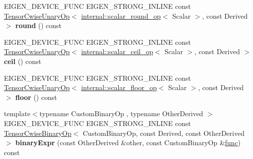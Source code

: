 \begin{DoxyCompactItemize}
E\+I\+G\+E\+N\+\_\+\+D\+E\+V\+I\+C\+E\+\_\+\+F\+U\+NC E\+I\+G\+E\+N\+\_\+\+S\+T\+R\+O\+N\+G\+\_\+\+I\+N\+L\+I\+NE const \hyperlink{class_eigen_1_1_tensor_cwise_unary_op}{Tensor\+Cwise\+Unary\+Op}$<$ \hyperlink{struct_eigen_1_1internal_1_1scalar__round__op}{internal\+::scalar\+\_\+round\+\_\+op}$<$ Scalar $>$, const Derived $>$ {\bfseries round} () const
\item 
\mbox{\label{class_eigen_1_1_tensor_base_3_01_derived_00_01_read_only_accessors_01_4_afe6c3cbfe145dca6de73e1085c55b2f1}} 
E\+I\+G\+E\+N\+\_\+\+D\+E\+V\+I\+C\+E\+\_\+\+F\+U\+NC E\+I\+G\+E\+N\+\_\+\+S\+T\+R\+O\+N\+G\+\_\+\+I\+N\+L\+I\+NE const \hyperlink{class_eigen_1_1_tensor_cwise_unary_op}{Tensor\+Cwise\+Unary\+Op}$<$ \hyperlink{struct_eigen_1_1internal_1_1scalar__ceil__op}{internal\+::scalar\+\_\+ceil\+\_\+op}$<$ Scalar $>$, const Derived $>$ {\bfseries ceil} () const
\item 
\mbox{\label{class_eigen_1_1_tensor_base_3_01_derived_00_01_read_only_accessors_01_4_ac4d13e5ee3c8e5c992df4f7482aec549}} 
E\+I\+G\+E\+N\+\_\+\+D\+E\+V\+I\+C\+E\+\_\+\+F\+U\+NC E\+I\+G\+E\+N\+\_\+\+S\+T\+R\+O\+N\+G\+\_\+\+I\+N\+L\+I\+NE const \hyperlink{class_eigen_1_1_tensor_cwise_unary_op}{Tensor\+Cwise\+Unary\+Op}$<$ \hyperlink{struct_eigen_1_1internal_1_1scalar__floor__op}{internal\+::scalar\+\_\+floor\+\_\+op}$<$ Scalar $>$, const Derived $>$ {\bfseries floor} () const
\item 
\mbox{\label{class_eigen_1_1_tensor_base_3_01_derived_00_01_read_only_accessors_01_4_a8065112cd3d6e613a20073bd8b0b0041}} 
{\footnotesize template$<$typename Custom\+Binary\+Op , typename Other\+Derived $>$ }\\E\+I\+G\+E\+N\+\_\+\+D\+E\+V\+I\+C\+E\+\_\+\+F\+U\+NC E\+I\+G\+E\+N\+\_\+\+S\+T\+R\+O\+N\+G\+\_\+\+I\+N\+L\+I\+NE const \hyperlink{class_eigen_1_1_tensor_cwise_binary_op}{Tensor\+Cwise\+Binary\+Op}$<$ Custom\+Binary\+Op, const Derived, const Other\+Derived $>$ {\bfseries binary\+Expr} (const Other\+Derived \&other, const Custom\+Binary\+Op \&\hyperlink{structfunc}{func}) const
\item 
\mbox{\label{class_eigen_1_1_tensor_base_3_01_derived_00_01_read_only_accessors_01_4_ad214851ee6cb885e3b8889bc1383b01a}} 

\end{DoxyCompactItemize}
